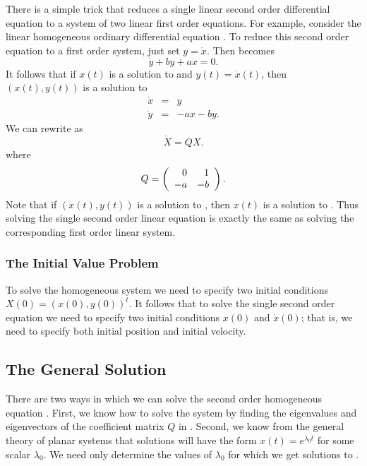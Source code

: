 There is a simple trick that reduces a single linear second order
differential equation to a system of two linear first order equations.
For example, consider the linear homogeneous ordinary differential
equation .  To reduce this second order equation to a first order
system, just set $y=\dot{x}$.  Then  becomes
\[
\dot{y} + by + ax = 0.
\]
It follows that if $x(t)$ is a solution to  and
$y(t)=\dot{x}(t)$, then $(x(t),y(t))$ is a solution to
\begin{equation}  \label{e:soex1sys}
\begin{array}{rcl}
\dot{x} & = & y \\
\dot{y} & = & -ax - by.
\end{array}
\end{equation}
We can rewrite  as
\[
\dot{X} = Q X.
\]
where
\begin{equation}  \label{e:coeffmatQ}
Q =  \left(\begin{array}{rr} 0 & 1\\ -a &-b\end{array}\right).
\end{equation}
Note that if $(x(t),y(t))$ is a solution to , then
$x(t)$ is a solution to .  Thus solving the single
second order linear equation is exactly the same as solving the
corresponding first order linear system.

\subsubsection*{The Initial Value Problem}

To solve the homogeneous system  we need to specify
two initial conditions $X(0)=(x(0),y(0))^t$.  It follows that to
solve the single second order equation we need to specify two initial
conditions $x(0)$ and $\dot{x}(0)$; that is, we need to specify
both initial position and
initial velocity.

\subsection*{The General Solution}

There are two ways in which we can solve
the second order homogeneous equation .  First,
we know how to solve the system  by finding the
eigenvalues and eigenvectors of the coefficient matrix $Q$ in
.  Second, we know from the general theory of
planar systems that solutions will have the form $x(t)=e^{\lambda_0t}$
for some scalar $\lambda_0$.  We need only determine the values of
$\lambda_0$ for which we get solutions to .


